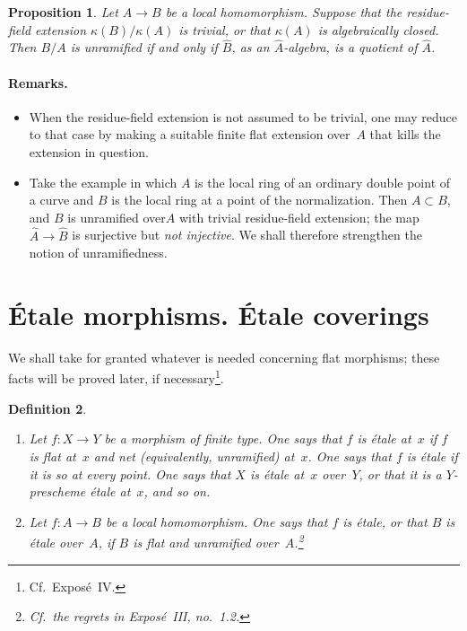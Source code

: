 \documentclass[11pt,oneside]{amsbook}
\newtheorem{proposition}{Proposition}[section]
\newtheorem{definition}[proposition]{Definition}
\theoremstyle{remark}
\theoremstyle{plain}
\numberwithin{equation}{section}
\begin{document}
\begin{proposition}
\label{I.3.7}
Let \(A\to B\) be a local homomorphism.  Suppose that the residue-field
extension \(\kappa(B)/\kappa(A)\) is trivial, or that \(\kappa(A)\) is
algebraically closed.  Then \(B/A\) is unramified if and only if
\(\widehat B\), as an \(\widehat A\)-algebra, is a quotient of
\(\widehat A\).
\end{proposition}

\paragraph{Remarks.}
\begin{itemize}
\item When the residue-field extension is not assumed to be trivial, one may
  reduce to that case by making a suitable finite flat extension over~\(A\)
  that kills the extension in question.
\item Take the example in which \(A\) is the local ring of an ordinary
  double point of a curve and \(B\) is the local ring at a point of the
  normalization.  Then \(A\subset B\), and \(B\) is unramified
  over\(A\) with
  trivial residue-field extension; the map
  \(\widehat A\to\widehat B\) is surjective but \emph{not injective}.
  We shall therefore strengthen the notion of unramifiedness.
\end{itemize}

\section{Étale morphisms. Étale coverings}
\label{I.4}

We shall take for granted whatever is needed concerning flat morphisms; these
facts will be proved later, if necessary\footnote{Cf.\ Expos\'e~IV.}.

\begin{definition}
\label{I.4.1}
\begin{enumerate}
\item[(a)] Let \(f\colon X\to Y\) be a morphism of finite type.  One says
  that \(f\) is \emph{étale} at~\(x\) if \(f\) is flat at~\(x\) and net
  (equivalently, unramified) at~\(x\).  One says that \(f\) is étale if it
  is so at every point.  One says that \(X\) is étale at~\(x\) over~\(Y\),
  or that it is a \(Y\)-prescheme étale at~\(x\), and so on.
\item[(b)] Let \(f\colon A\to B\) be a local homomorphism.  One says that
  \(f\) is étale, or that \(B\) is étale over~\(A\), if \(B\) is flat and
  unramified over~\(A\).\footnote{Cf.\ the regrets in Expos\'e~III,
  no.~1.2.}
\end{enumerate}
\end{definition}
\end{document}
